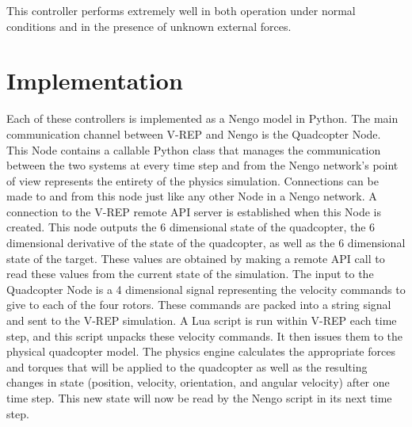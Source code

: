 \documentclass[letterpaper,12pt,titlepage,oneside,final]{book}
\begin{document}
This controller performs extremely well in both operation under normal conditions and in the presence of unknown external forces.



\section{Implementation}


Each of these controllers is implemented as a Nengo model in Python. 
The main communication channel between V-REP and Nengo is the Quadcopter Node. 
This Node contains a callable Python class that manages the communication between the two systems at every time step and from the Nengo network's point of view represents the entirety of the physics simulation. 
Connections can be made to and from this node just like any other Node in a Nengo network. 
A connection to the V-REP remote API server is established when this Node is created. 
This node outputs the 6 dimensional state of the quadcopter, the 6 dimensional derivative of the state of the quadcopter, as well as the 6 dimensional state of the target. 
These values are obtained by making a remote API call to read these values from the current state of the simulation. The input to the Quadcopter Node is a 4 dimensional signal representing the velocity commands to give to each of the four rotors. 
These commands are packed into a string signal and sent to the V-REP simulation. 
A Lua script is run within V-REP each time step, and this script unpacks these velocity commands. 
It then issues them to the physical quadcopter model. The physics engine calculates the appropriate forces and torques that will be applied to the quadcopter as well as the resulting changes in state (position, velocity, orientation, and angular velocity) after one time step. 
This new state will now be read by the Nengo script in its next time step.
\end{document}
